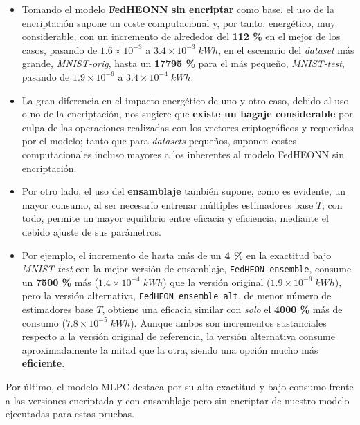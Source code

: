 \documentclass[00-Trabajo_Final.tex]{subfiles}
\begin{document}
\begin{itemize}[topsep=2pt, itemsep=2pt]
    \item Tomando el modelo \textbf{FedHEONN sin encriptar} como base, el uso de la encriptación supone un coste computacional y, por tanto, energético, muy considerable, con un incremento de alrededor del \textbf{112 \%} en el mejor de los casos, pasando de $1.6\times10^{-3}$ a $3.4\times10^{-3}\;kWh$, en el escenario del \textit{dataset} más grande, \textit{MNIST-orig}, hasta un \textbf{17795 \%} para el más pequeño, \textit{MNIST-test}, pasando de $1.9\times10^{-6}$ a $3.4\times10^{-4}\;kWh$.

    \item La gran diferencia en el impacto energético de uno y otro caso, debido al uso o no de la encriptación, nos sugiere que \textbf{existe un bagaje considerable} por culpa de las operaciones realizadas con los vectores criptográficos y requeridas por el modelo; tanto que para \textit{datasets} pequeños, suponen costes computacionales incluso mayores a los inherentes al modelo FedHEONN sin encriptación.

    \item Por otro lado, el uso del \textbf{ensamblaje} también supone, como es evidente, un mayor consumo, al ser necesario entrenar múltiples estimadores base ${T}$; con todo, permite un mayor equilibrio entre eficacia y eficiencia, mediante el debido ajuste de sus parámetros.

    \item Por ejemplo, el incremento de hasta más de un \textbf{4 \%} en la exactitud bajo \textit{MNIST-test} con la mejor versión de ensamblaje, \verb|FedHEON_ensemble|, consume un \textbf{7500 \%} más ($1.4\times10^{-4}\;kWh$) que la versión original ($1.9\times10^{-6}\;kWh$), pero la versión alternativa, \verb|FedHEON_ensemble_alt|, de menor número de estimadores base $T$, obtiene una eficacia similar con \textit{solo} el \textbf{4000 \% }más de consumo ($7.8\times10^{-5}\;kWh$). Aunque ambos son incrementos sustanciales respecto a la versión original de referencia, la versión alternativa consume aproximadamente la mitad que la otra, siendo una opción mucho más \textbf{eficiente}.
\end{itemize}

\vspace{0.5em}

Por último, el modelo MLPC destaca por su alta exactitud y bajo consumo frente a las versiones encriptada y con ensamblaje pero sin encriptar de nuestro modelo ejecutadas para estas pruebas.
\end{document}
